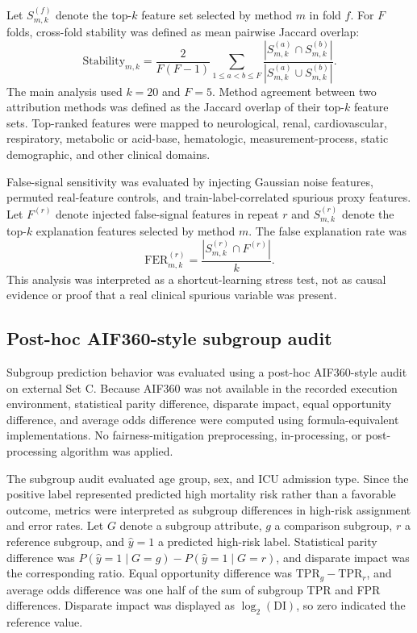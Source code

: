 \documentclass[10pt,twocolumn,letterpaper]{article}
\begin{document}
Let $S_{m,k}^{(f)}$ denote the top-$k$ feature set selected by method $m$ in fold $f$. For $F$ folds, cross-fold stability was defined as mean pairwise Jaccard overlap:
\begin{equation}
\mathrm{Stability}_{m,k}
=
\frac{2}{F(F-1)}
\sum_{1 \leq a < b \leq F}
\frac{
|S_{m,k}^{(a)} \cap S_{m,k}^{(b)}|
}{
|S_{m,k}^{(a)} \cup S_{m,k}^{(b)}|
}.
\end{equation}
The main analysis used $k=20$ and $F=5$. Method agreement between two attribution methods was defined as the Jaccard overlap of their top-$k$ feature sets. Top-ranked features were mapped to neurological, renal, cardiovascular, respiratory, metabolic or acid-base, hematologic, measurement-process, static demographic, and other clinical domains.

False-signal sensitivity was evaluated by injecting Gaussian noise features, permuted real-feature controls, and train-label-correlated spurious proxy features. Let $F^{(r)}$ denote injected false-signal features in repeat $r$ and $S_{m,k}^{(r)}$ denote the top-$k$ explanation features selected by method $m$. The false explanation rate was
\begin{equation}
\mathrm{FER}_{m,k}^{(r)}
=
\frac{
|S_{m,k}^{(r)} \cap F^{(r)}|
}{k}.
\end{equation}
This analysis was interpreted as a shortcut-learning stress test, not as causal evidence or proof that a real clinical spurious variable was present.

\subsection{Post-hoc AIF360-style subgroup audit}

Subgroup prediction behavior was evaluated using a post-hoc AIF360-style audit on external Set C. Because AIF360 was not available in the recorded execution environment, statistical parity difference, disparate impact, equal opportunity difference, and average odds difference were computed using formula-equivalent implementations. No fairness-mitigation preprocessing, in-processing, or post-processing algorithm was applied.

The subgroup audit evaluated age group, sex, and ICU admission type. Since the positive label represented predicted high mortality risk rather than a favorable outcome, metrics were interpreted as subgroup differences in high-risk assignment and error rates. Let $G$ denote a subgroup attribute, $g$ a comparison subgroup, $r$ a reference subgroup, and $\hat{y}=1$ a predicted high-risk label. Statistical parity difference was $P(\hat{y}=1 \mid G=g)-P(\hat{y}=1 \mid G=r)$, and disparate impact was the corresponding ratio. Equal opportunity difference was $\mathrm{TPR}_g-\mathrm{TPR}_r$, and average odds difference was one half of the sum of subgroup TPR and FPR differences. Disparate impact was displayed as $\log_2(\mathrm{DI})$, so zero indicated the reference value.
\end{document}
